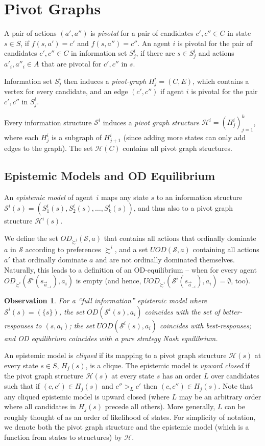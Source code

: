 \documentclass[letterpaper]{article} %
\def\calS{\mathcal{S}}
\def\calH{\mathcal{H}}
\newtheorem{observation}[theorem]{Observation}
\begin{document}
\section{Pivot Graphs}
A pair of actions $(a',a'')$ is \emph{pivotal} for a pair of candidates $c',c''\in C$ in state $s\in S$, if $f(s,a')=c'$ and $f(s,a'')=c''$.
An agent $i$ is pivotal for the pair of candidates $c',c''\in C$ in information set $S^i_j$, if there are $s\in S^i_j$ and actions $a'_i,a''_i\in A$ that are pivotal for $c',c''$ in $s$.

Information set $S^{i}_j$ then induces a \emph{pivot-graph} $H^i_j=(C,E)$, which contains a vertex for every candidate, and an edge $(c',c'')$ if agent $i$ is pivotal for the pair $c',c''$ in $S^i_j$.

Every information structure $\mathcal{S}^i$ induces a \emph{pivot graph structure} $\mathcal{H}^i=(H^i_{j})_{j=1}^k$, where each $H^i_j$ is a subgraph of $H^i_{j+1}$ (since adding more states can only add edges to the graph). The set $\mathscr{H}(C)$ contains all pivot graph structures.

\subsection{Epistemic Models and OD Equilibrium}
 An \emph{epistemic model} of agent~$i$ maps any state $s$ to an information structure $\calS^i(s)=(S^i_1(s),S^i_2(s),\ldots,S^i_k(s))$, and thus also to a pivot graph structure $\calH^i(s)$.

 We define the set $OD_{\succsim^i}(\calS,a)$ that contains all actions that ordinally dominate $a$ in $\calS$ according to preferences $\succsim^i$, and a set $UOD(\calS,a)$ containing all actions $a'$ that ordinally dominate $a$ and are not ordinally dominated themselves. Naturally, this leads to a definition of an OD-equilibrium -- when for every agent $OD_{\succsim^i}(\calS^i(s_{\vec a_{-i}}),a_i)$ is empty (and hence, $UOD_{\succsim^i}(\calS^i(s_{\vec a_{-i}}),a_i)=\emptyset$, too).

\begin{observation}
For a ``full information'' epistemic model where $\calS^i(s)=\left(\{s\}\right)$, the set $OD(\calS^i(s),a_i)$ coincides with the set of better-responses to $(s,a_i)$; the set $UOD(\calS^i(s),a_i)$ coincides with best-responses; and OD equilibrium coincides with a pure strategy Nash equilibrium.
\end{observation}

An epistemic model is \emph{cliqued} if its mapping to a pivot graph structure $\calH(s)$ at every state $s\in S$, $H_j(s)$, is a clique. The epistemic model is \emph{upward closed} if the pivot graph structure $\calH(s)$ at every state $s$ has an order $L$ over candidates such that if $(c,c')\in H_j(s)$ and $c''>_L c'$ then $(c,c'')\in H_j(s)$. Note that any cliqued epistemic model is upward closed (where $L$ may be an arbitrary order where all candidates in $H_j(s)$ precede all others).	More generally, $L$ can be roughly thought of as an order of likelihood of states. For simplicity of notation, we denote both the pivot graph structure and the epistemic model (which is a function from states to structures) by $\calH$.
\end{document}
